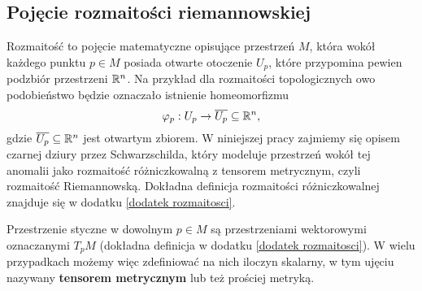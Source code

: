 \subsection{Pojęcie rozmaitości riemannowskiej}


Rozmaitość to pojęcie matematyczne opisujące przestrzeń $M$, która wokół każdego punktu $p \in M$ posiada otwarte otoczenie $U_p$, które przypomina pewien podzbiór przestrzeni $\mathbb{R}^n$. Na przykład dla rozmaitości topologicznych owo podobieństwo będzie oznaczało istnienie homeomorfizmu
$$ \varphi_p: U_p \to \overline{U_p} \subseteq \mathbb{R}^n, $$
gdzie $\overline{U_p} \subseteq \mathbb{R}^n$ jest otwartym zbiorem. W niniejszej pracy zajmiemy się opisem czarnej dziury przez Schwarzschilda, który modeluje przestrzeń wokół tej anomalii jako rozmaitość różniczkowalną z tensorem metrycznym, czyli rozmaitość Riemannowską. Dokładna definicja rozmaitości różniczkowalnej znajduje się w dodatku \ref{dodatek rozmaitosci}.



Przestrzenie styczne w dowolnym $p\in M$ są przestrzeniami wektorowymi oznaczanymi $T_pM$ (dokładna definicja w {dodatku} \ref{dodatek rozmaitosci}). W wielu przypadkach możemy więc zdefiniować na nich iloczyn skalarny, w tym ujęciu nazywany \textbf{tensorem metrycznym} lub też prościej metryką.


